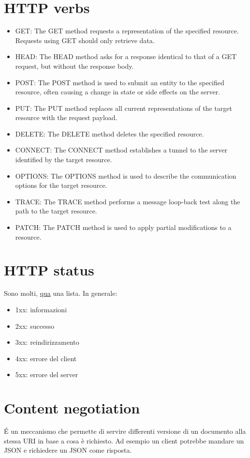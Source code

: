 \documentclass[11pt,a4paper]{book}
\begin{document}
\section{HTTP verbs}
\begin{itemize}
	\item GET: The GET method requests a representation of the specified resource. Requests using GET should only retrieve data.
	\item HEAD: The HEAD method asks for a response identical to that of a GET request, but without the response body.
	\item POST: The POST method is used to submit an entity to the specified resource, often causing a change in state or side effects on the server.
	\item PUT: The PUT method replaces all current representations of the target resource with the request payload.
	\item DELETE: The DELETE method deletes the specified resource.
	\item CONNECT: The CONNECT method establishes a tunnel to the server identified by the target resource.
	\item OPTIONS: The OPTIONS method is used to describe the communication options for the target resource.
	\item TRACE: The TRACE method performs a message loop-back test along the path to the target resource.
	\item PATCH: The PATCH method is used to apply partial modifications to a resource. 
\end{itemize}

\section{HTTP status}
Sono molti, \href{https://it.wikipedia.org/wiki/Codici_di_stato_HTTP}{qua} una lista.
In generale:
\begin{itemize}
	\item 1xx: informazioni
	\item 2xx: successo
	\item 3xx: reindirizzamento
	\item 4xx: errore del client
	\item 5xx: errore del server
\end{itemize}

\section{Content negotiation}
É un meccanismo che permette di servire differenti versione di un documento alla stessa URI in base a cosa è richiesto. Ad esempio un client potrebbe mandare un JSON e richiedere un JSON come risposta.
\end{document}
